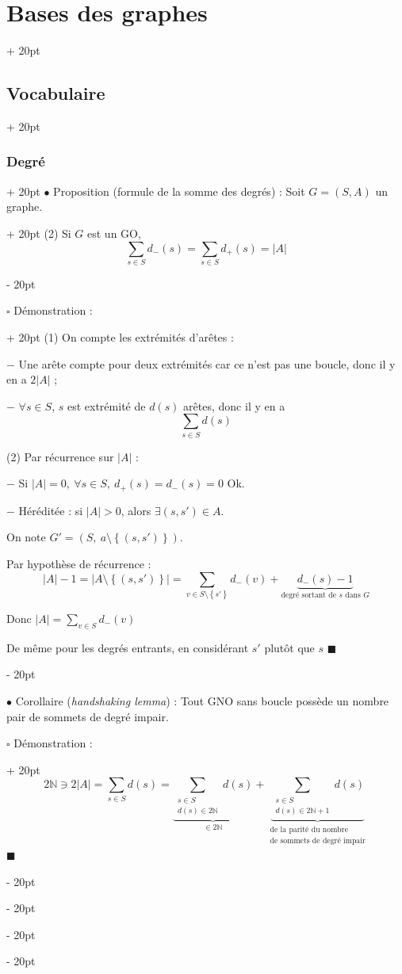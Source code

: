 \documentclass[a4paper, 12pt, twoside]{article}
\newcommand{\N}{\mathbb{N}} %
\newcommand{\set}[1]{\left\{ #1 \right\}}
\newcommand{\abs}[1]{\left\lvert #1 \right\rvert}
\newcommand{\ind}[1][20pt]{\advance\leftskip + #1}
\newcommand{\deind}[1][20pt]{\advance\leftskip - #1}
\newenvironment{indt}[2][20pt]{#2 \par \ind[#1]}{\par \deind} %
\begin{document}
\begin{indt}{\section{Bases des graphes}}
\begin{indt}{\subsection{Vocabulaire}}
\begin{indt}{\subsubsection{Degré}}
\begin{indt}{$\bullet$ Proposition (formule de la somme des degrés) : Soit $G = (S, A)$ un graphe.}
                    (2) Si $G$ est un GO,
                    \[
                        \sum_{s \in S} d_-(s) = \sum_{s \in S} d_+(s) = \abs{A}
                    \]
                \end{indt}

                \begin{indt}{$\square$ Démonstration :}
                    (1) On compte les extrémités d'arêtes :

                    $-$ Une arête compte pour deux extrémités car ce n'est pas une boucle, donc il y en a $2\abs A$ ;

                    $-$ $\forall s \in S$, $s$ est extrémité de $d(s)$ arêtes, donc il y en a
                    \[
                        \sum_{s \in S} d(s)
                    \]
                    
                    (2) Par récurrence sur $\abs A$ :

                    $-$ Si $\abs A = 0,\ \forall s \in S,\ d_+(s) = d_-(s) = 0$ Ok.

                    $-$ Héréditée : si $\abs A > 0$, alors $\exists (s, s') \in A$.

                    On note $G' = (S,\ a \setminus \set{(s, s')})$.

                    Par hypothèse de récurrence :
                    \[
                        \abs A - 1 = \abs{A \setminus \set{(s, s')}} = \sum_{v \in S \setminus \set{s'}} d_-(v) + \underbrace{d_-(s) - 1}_{\text{degré sortant de $s$ dans $G$}}
                    \]
                    
                    Donc $\abs A = \displaystyle \sum_{v \in S} d_-(v)$

                    De même pour les degrés entrants, en considérant $s'$ plutôt que $s$
                    $\blacksquare$
                \end{indt}

                \vspace{6pt}
                
                $\bullet$ Corollaire (\textit{handshaking lemma}) : Tout GNO sans boucle possède un nombre pair de sommets de degré impair.

                \begin{indt}{$\square$ Démonstration :}
                    \[
                        2\N \ni 2\abs A
                        = \sum_{s \in S} d(s)
                        = \underbrace{\sum_{\substack{s \in S \\ d(s) \in 2\N}} d(s)}_{\in 2\N} + \underbrace{\sum_{\substack{s \in S \\ d(s) \in 2\N + 1}} d(s)}_{\substack{\text{de la parité du nombre} \\ \text{de sommets de degré impair}}}
                    \]
                    $\blacksquare$
                \end{indt}
                

\end{indt}
\end{indt}
\end{indt}
\end{document}
